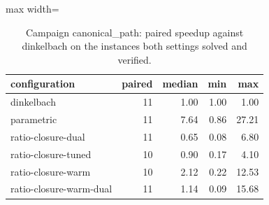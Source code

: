 \begin{table}[tbp]
\centering
\caption{Campaign canonical\_path: paired speedup against dinkelbach on the instances both settings solved and verified.}
\label{tab:canonical_path-speedup}
\small
\begin{adjustbox}{max width=\textwidth}
\begin{tabular}{lrrrr}
\toprule
configuration & paired & median & min & max \\
\midrule
dinkelbach & 11 & 1.00 & 1.00 & 1.00 \\
parametric & 11 & 7.64 & 0.86 & 27.21 \\
ratio-closure-dual & 11 & 0.65 & 0.08 & 6.80 \\
ratio-closure-tuned & 10 & 0.90 & 0.17 & 4.10 \\
ratio-closure-warm & 10 & 2.12 & 0.22 & 12.53 \\
ratio-closure-warm-dual & 11 & 1.14 & 0.09 & 15.68 \\
\bottomrule
\end{tabular}
\end{adjustbox}
\end{table}
